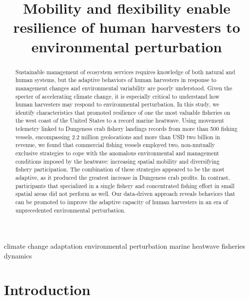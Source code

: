 \documentclass[]{elsarticle} %
\begin{document}
\begin{frontmatter}

  \title{Mobility and flexibility enable resilience of human harvesters to
environmental perturbation}
      
  \begin{abstract}
  Sustainable management of ecosystem services requires knowledge of both
  natural and human systems, but the adaptive behaviors of human
  harvesters in response to management changes and environmental
  variability are poorly understood. Given the specter of accelerating
  climate change, it is especially critical to understand how human
  harvesters may respond to environmental perturbation. In this study, we
  identify characteristics that promoted resilience of one the most
  valuable fisheries on the west coast of the United States to a record
  marine heatwave. Using movement telemetry linked to Dungeness crab
  fishery landings records from more than 500 fishing vessels,
  encompassing 2.2 million geolocations and more than USD two billion in
  revenue, we found that commercial fishing vessels employed two,
  non-mutually exclusive strategies to cope with the anomalous
  environmental and management conditions imposed by the heatwave:
  increasing spatial mobility and diversifying fishery participation. The
  combination of these strategies appeared to be the most adaptive, as it
  produced the greatest increase in Dungeness crab profits. In contrast,
  participants that specialized in a single fishery and concentrated
  fishing effort in small spatial areas did not perform as well. Our
  data-driven approach reveals behaviors that can be promoted to improve
  the adaptive capacity of human harvesters in an era of unprecedented
  environmental perturbation.
  \end{abstract}
   \begin{keyword} climate change adaptation \textbar{} environmental perturbation
\textbar{} marine heatwave \textbar{} fisheries dynamics\end{keyword}
 \end{frontmatter}

\hypertarget{intro}{%
\section{Introduction}\label{intro}}
\end{document}

